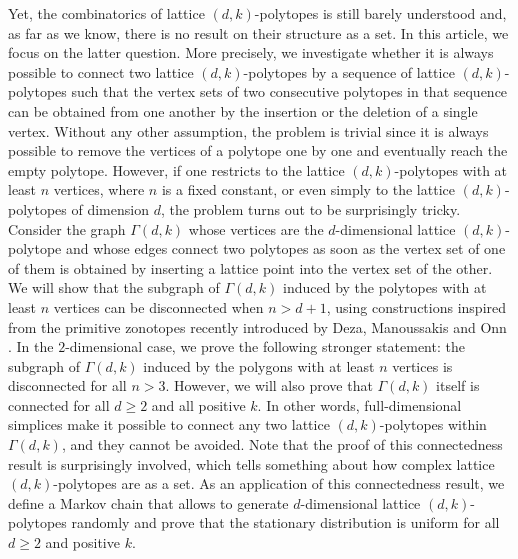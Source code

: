 \documentclass[a4paper]{article}
\begin{document}
Yet, the combinatorics of lattice $(d,k)$-polytopes is still barely understood and, as far as we know, there is no result on their structure as a set. In this article, we focus on the latter question. More precisely, we investigate whether it is always possible to connect two lattice $(d,k)$-polytopes by a sequence of lattice $(d,k)$-polytopes such that the vertex sets of two consecutive polytopes in that sequence can be obtained from one another by the insertion or the deletion of a single vertex. Without any other assumption, the problem is trivial since it is always possible to remove the vertices of a polytope one by one and eventually reach the empty polytope. However, if one restricts to the lattice $(d,k)$-polytopes with at least $n$ vertices, where $n$ is a fixed constant, or even simply to the lattice $(d,k)$-polytopes of dimension $d$, the problem turns out to be surprisingly tricky. Consider the graph $\Gamma(d,k)$ whose vertices are the $d$-dimensional lattice $(d,k)$-polytope and whose edges connect two polytopes as soon as the vertex set of one of them is obtained by inserting a lattice point into the vertex set of the other. We will show that the subgraph of $\Gamma(d,k)$ induced by the polytopes with at least $n$ vertices can be disconnected when $n>d+1$, using constructions inspired from the primitive zonotopes recently introduced by Deza, Manoussakis and Onn \cite{DezaManoussakisOnn2018}. In the $2$-dimensional case, we prove the following stronger statement: the subgraph of $\Gamma(d,k)$ induced by the polygons with at least $n$ vertices is disconnected for all $n>3$. However, we will also prove that $\Gamma(d,k)$ itself is connected for all $d\geq2$ and all positive $k$. In other words, full-dimensional simplices make it possible to connect any two lattice $(d,k)$-polytopes within $\Gamma(d,k)$, and they cannot be avoided. Note that the proof of this connectedness result is surprisingly involved, which tells something about how complex lattice $(d,k)$-polytopes are as a set. As an application of this connectedness result, we define a Markov chain that allows to generate $d$-dimensional lattice $(d,k)$-polytopes randomly and prove that the stationary distribution is uniform for all $d\geq2$ and positive $k$.
\end{document}
